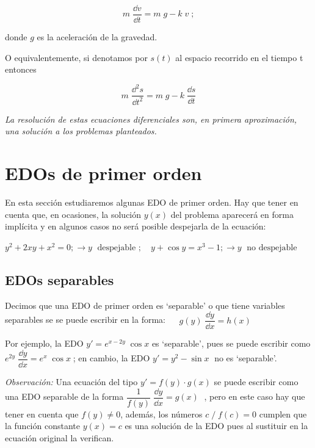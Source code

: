 \begin{equation*}
	m\; \dfrac {\dd v}{\dd t} = m\; g - k\; v\;;
\end{equation*} 
   
donde $g$ es la aceleración de la gravedad.
   
   O equivalentemente, si denotamos por $s(t)$ al espacio recorrido en el tiempo t entonces 
   
 \begin{equation*}
 	m\; \dfrac {\dd^2 s}{\dd t^2} = m\; g - k\; \dfrac {\dd s}{\dd t}
 \end{equation*} 
 
 \vspace{3mm}
 
 \emph{La resolución de estas ecuaciones diferenciales son, en primera aproximación, una solución a los problemas planteados.}
 \section{EDOs de primer orden}
 
 En esta sección estudiaremos algunas EDO de primer orden. Hay que tener en cuenta que, en ocasiones, la solución $y(x)$ del problema aparecerá en forma implícita y en algunos casos no será posible despejarla de la ecuación:

$y^2+2xy+x^2=0;\to y\;  \text { despejable }; \quad
y+\cos y=x^3-1; \to y\;  \text { no despejable }$


\subsection{EDOs separables}

\begin{defi}
Decimos que una EDO de primer orden es `separable' o que tiene variables separables se se puede escribir en la forma: $\displaystyle \quad  \boxed{\;  g(y)\; \dfrac {\dd y}{\dd x}=h(x)\;} $
\end{defi}

Por ejemplo, la EDO $y'=e^{x-2y}\; \cos x$ es `separable', pues se puede escribir como $e^{2y}\; \dfrac {\dd y}{\dd x}=e^x\; \cos x\; $;  en cambio, la EDO $y'=y^2-\sin x\; $ no es `separable'.

\vspace{2mm}

\emph{Observación:} Una ecuación del tipo $y'=f(y)\cdot g(x)$ se puede escribir como una EDO separable de la forma $\dfrac 1 {f(y)}\; \dfrac {\dd y}{\dd x} = g(x)\;$ , pero en este caso hay que tener en cuenta que $f(y)\neq 0$, además, los números $c\; / \; f(c)=0$ cumplen que la función constante $y(x)=c$ es una solución de la EDO pues al sustituir en la ecuación original la verifican.

